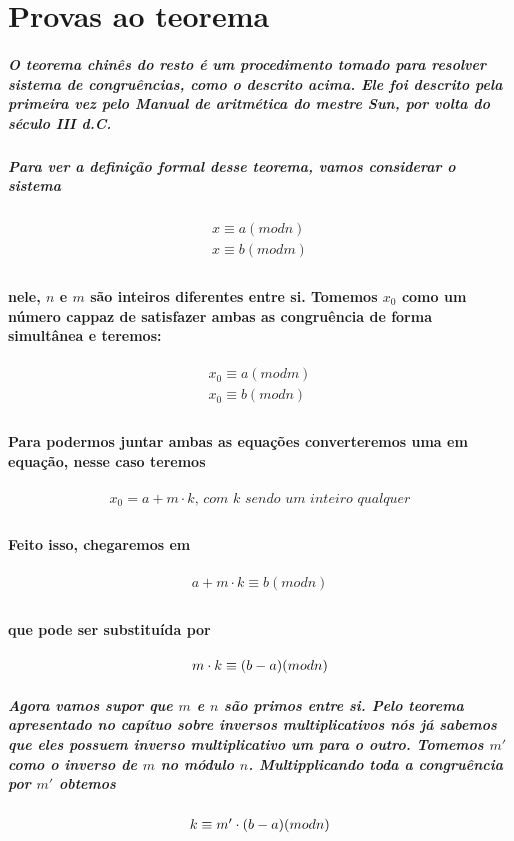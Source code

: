 \section{Provas ao teorema}

\subparagraph{
O teorema chin\^es do resto \'e um procedimento tomado para resolver sistema de congru\^encias, como o descrito acima. Ele foi descrito pela primeira vez pelo Manual de aritm\'etica do mestre Sun, por volta do s\'eculo III d.C. 
}
\subparagraph{
Para ver a defini\c{c}\~ao formal desse teorema, vamos considerar o sistema
}
\[	
	\begin{array}{c}
		\textit{$x \equiv a (mod n)$}\\
		\textit{$x \equiv b (mod m)$}\\
	\end{array}
\]
\paragraph{
nele, $n$ e $m$ s\~ao inteiros diferentes entre si. Tomemos $x_0$ como um n\'umero cappaz de satisfazer ambas as congru\^encia de forma simult\^anea e teremos:
}
\[	
	\begin{array}{c}
		\textit{$x_0 \equiv a (mod m)$}\\
		\textit{$x_0 \equiv b (mod n)$}\\
	\end{array}
\]
\paragraph{
Para podermos juntar ambas as equa\c{c}\~oes converteremos uma em equa\c{c}\~ao, nesse caso teremos 
}
\[	
	\begin{array}{c}
		\textit{$x_0 = a + m\cdot k$, com $k$ sendo um inteiro qualquer}\\
	\end{array}
\]
\paragraph{
Feito isso, chegaremos em
}
\[	
	\begin{array}{c}
		\textit{$a + m\cdot k \equiv b (mod n)$}\\
	\end{array}
\]
\paragraph{
que pode ser substitu\'ida por
}
\[	
	\begin{array}{c}
		\textit{$ m\cdot k \equiv (b-a) (mod n)$}\\
	\end{array}
\]
\subparagraph{
Agora vamos supor que $m$ e $n$ s\~ao primos entre si. Pelo teorema apresentado no cap\'ituo sobre inversos multiplicativos n\'os j\'a sabemos que eles possuem inverso multiplicativo um para o outro. Tomemos $m'$ como o inverso de $m$ no m\'odulo $n$. Multipplicando toda a congru\^encia por $m'$ obtemos
}
\[	
	\begin{array}{c}
		\textit{$ k \equiv m'\cdot(b-a) (mod n)$}\\
	\end{array}
\]
